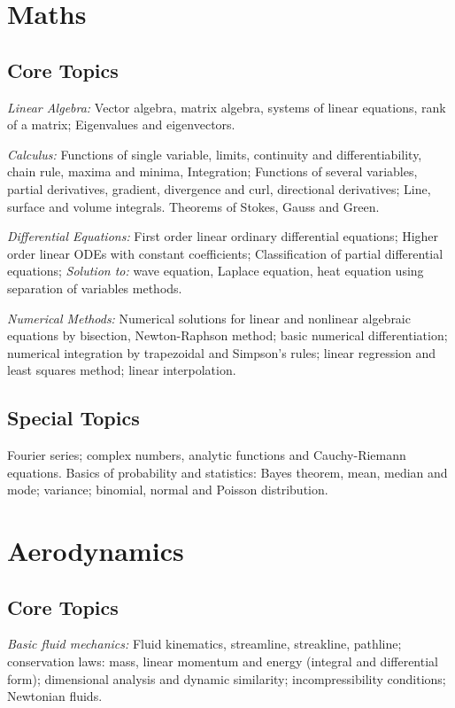 \section{Maths}
\subsection{Core Topics}
\noindent\textit{Linear Algebra:} Vector algebra, matrix algebra, systems of linear equations, rank of a matrix; Eigenvalues and eigenvectors.

\noindent\textit{Calculus:} Functions of single variable, limits, continuity and differentiability, chain rule, maxima and minima, Integration; Functions of several variables, partial derivatives, gradient, divergence and curl, directional derivatives; Line, surface and volume integrals. Theorems of Stokes, Gauss and Green.

\noindent\textit{Differential Equations:} First order linear ordinary differential equations; Higher order linear ODEs with constant coefficients; Classification of partial differential equations; \textit{Solution to:} wave equation, Laplace equation, heat equation using separation of variables methods.

\noindent\textit{Numerical Methods:} Numerical solutions for linear and nonlinear algebraic equations by bisection, Newton-Raphson method; basic numerical differentiation; numerical integration by trapezoidal and Simpson's rules; linear regression and least squares method; linear interpolation.

\subsection{Special Topics}
Fourier series; complex numbers, analytic functions and Cauchy-Riemann equations. Basics of probability and statistics: Bayes theorem, mean, median and mode; variance; binomial, normal and Poisson distribution.

\section{Aerodynamics}

\subsection{Core Topics}

\textit{Basic fluid mechanics:} Fluid kinematics, streamline, streakline, pathline; conservation laws: mass, linear momentum and energy (integral and differential form); dimensional analysis and dynamic similarity; incompressibility conditions; Newtonian fluids.

